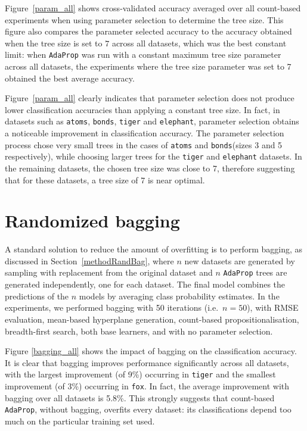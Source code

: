 \documentclass[a4paper,12pt]{report} %
\newcommand{\AdaProp}{\texttt{AdaProp}\xspace}
\newcommand{\tdsMA}{\texttt{atoms}\xspace}
\newcommand{\tdsMB}{\texttt{bonds}\xspace}
\newcommand{\tdsTG}{\texttt{tiger}\xspace}
\newcommand{\tdsFX}{\texttt{fox}\xspace}
\newcommand{\tdsEL}{\texttt{elephant}\xspace}
\begin{document}
Figure~\ref{param_all} shows cross-validated accuracy averaged over all count-based experiments 
	when using parameter selection to determine the tree size.
This figure also compares the parameter selected accuracy to the accuracy obtained when the tree size 
	is set to $7$ across all datasets, which was the best constant limit:
	when \AdaProp was run with a constant maximum tree size parameter across all datasets, 
	the experiments where the tree size parameter was set to 7 obtained the best average accuracy.

Figure~\ref{param_all} clearly indicates that parameter selection 
	does not produce lower classification accuracies than applying a constant tree size.
In fact, in datasets such as \tdsMA, \tdsMB, \tdsTG and \tdsEL,
	parameter selection obtains a noticeable improvement in classification accuracy.
The parameter selection process chose very small trees in the cases of \tdsMA and \tdsMB (sizes 3 and 5 respectively),
	while choosing larger trees for the \tdsTG and \tdsEL datasets.
In the remaining datasets, the chosen tree size was close to 7, therefore suggesting 
	that for these datasets, a tree size of 7 is near optimal.


\section{Randomized bagging}

A standard solution to reduce the amount of overfitting is to perform
	bagging, as discussed in Section~\ref{methodRandBag}, 
	where $n$ new datasets are generated by sampling with replacement
	from the original dataset and $n$ \AdaProp trees are generated independently, one for each dataset.
The final model combines the predictions of the $n$ models by averaging class probability estimates.
In the experiments, we performed bagging with 50 iterations (i.e.\ $n=50$), 
	with RMSE evaluation, mean-based hyperplane generation, count-based propositionalisation,
	breadth-first search, both base learners, and with no parameter selection.

Figure \ref{bagging_all} shows the impact of bagging on the classification accuracy.
It is clear that bagging improves performance significantly across all datasets, 
	with the largest improvement (of 9\%) occurring in \tdsTG and 
	the smallest improvement (of 3\%) occurring in \tdsFX.
In fact, the average improvement with bagging over all datasets is 5.8\%. 
This strongly suggests that count-based \AdaProp, without bagging, overfits every dataset: 
	its classifications depend too much on the particular training set used.
	
\end{document}
